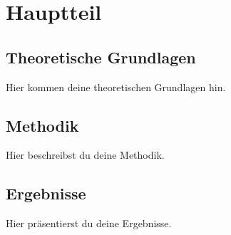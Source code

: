 \chapter{Hauptteil}
\label{ch:hauptteil}

\section{Theoretische Grundlagen}
\label{sec:grundlagen}

Hier kommen deine theoretischen Grundlagen hin.

\section{Methodik}
\label{sec:methodik}

Hier beschreibst du deine Methodik.

\section{Ergebnisse}
\label{sec:ergebnisse}

Hier präsentierst du deine Ergebnisse.

